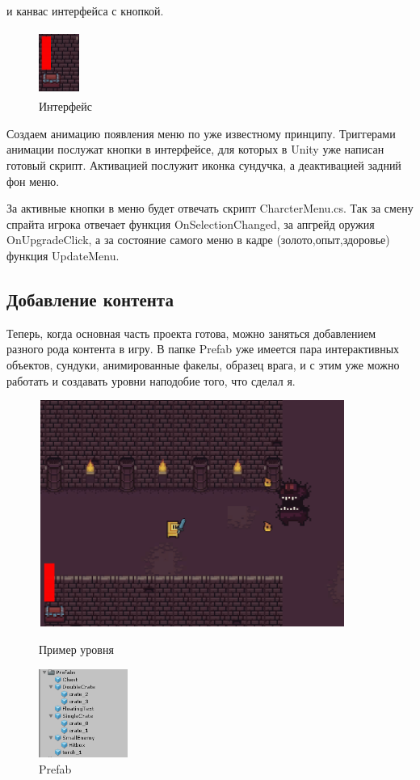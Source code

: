 \documentclass[a4paper,12pt]{article}
\begin{document}
и канвас интерфейса с кнопкой.

\begin{figure}[h]
\centering
\includegraphics[width =50px, height=80px]{pictures/hud.png}
\caption{Интерфейс}
\end{figure}

Создаем анимацию появления меню по уже известному принципу. Триггерами анимации послужат кнопки в интерфейсе, для которых в Unity уже написан готовый скрипт. Активацией послужит иконка сундучка, а деактивацией задний фон меню.

За активные кнопки в меню будет отвечать скрипт CharcterMenu.cs. Так за смену спрайта игрока отвечает функция OnSelectionChanged, за апгрейд оружия OnUpgradeClick, а за состояние самого меню в кадре (золото,опыт,здоровье) функция UpdateMenu.

\newpage
\subsection{Добавление контента}
Теперь, когда основная часть проекта готова, можно заняться добавлением разного рода контента в игру. В папке Prefab уже имеется пара интерактивных объектов, сундуки, анимированные факелы, образец врага, и с этим уже можно работать и создавать уровни наподобие того, что сделал я.

\begin{figure}[h!]
\centering
\includegraphics[width = 380px, height=280px]{pictures/boss.png}
\caption{Пример уровня}
\vspace{5mm}
\includegraphics[width = 110px, height=110px]{pictures/prefab.png}
\caption{Prefab}
\end{figure}
\end{document}
